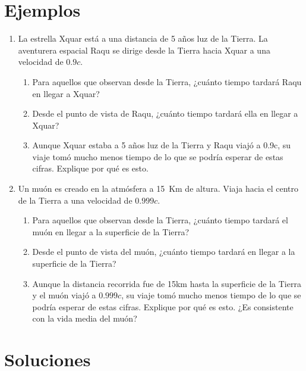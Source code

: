 \documentclass[11pt,a4paper]{article}
\begin{document}
\section{Ejemplos}
\begin{enumerate}
    
 \item La estrella Xquar está a una distancia de 5 años luz de la
Tierra. La aventurera espacial Raqu se dirige desde la Tierra
hacia Xquar a una velocidad de $0.9c$.
\begin{enumerate}[label=(\alph*)]
    \item Para aquellos que observan desde la Tierra, ¿cuánto tiempo tardará
Raqu en llegar a Xquar?
\item Desde el punto de vista de Raqu, ¿cuánto tiempo tardará ella
en llegar a Xquar?
\item Aunque Xquar estaba a 5 años luz de la Tierra
y Raqu viajó a 0.9c, su viaje tomó mucho
menos tiempo de lo que se podría esperar de estas cifras.
Explique por qué es esto.
\end{enumerate}


\item Un muón es creado en la atmósfera a 15~Km de altura. Viaja hacia el centro de la Tierra a una velocidad de $0.999c$. 
\label{item:muon}

\begin{enumerate}[label=(\alph*)]
    \item Para aquellos que observan desde la Tierra, ¿cuánto tiempo tardará
el muón en llegar a la superficie de la Tierra?
\item Desde el punto de vista del muón, ¿cuánto tiempo tardará
en llegar a la superficie de la Tierra?
\item Aunque la distancia recorrida fue de 15km hasta la superficie de la Tierra y el muón viajó a $0.999c$, 
su viaje tomó mucho
menos tiempo de lo que se podría esperar de estas cifras.
Explique por qué es esto. ¿Es consistente con la vida media del muón?
\end{enumerate}
\end{enumerate}

\section{Soluciones}
\end{document}
